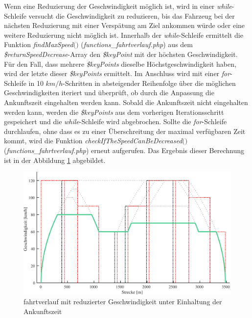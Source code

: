 Wenn eine Reduzierung der Geschwindigkeit möglich ist, wird in einer \textit{while}-Schleife versucht die Geschwindigkeit zu reduzieren, bis das Fahrzeug bei der nächsten Reduzierung mit einer Verspätung am Ziel ankommen würde oder eine weitere Reduzierung nicht möglich ist. Innerhalb der \textit{while}-Schleife ermittelt die Funktion \textit{find\-Max\-Speed$($$)$} (\textit{functions\_fahrtverlauf.php}) aus dem \textit{\$returnSpeedDecrease}-Array den \textit{\$keyPoint} mit der höchsten Geschwindigkeit. Für den Fall, dass mehrere \textit{\$keyPoints} dieselbe Höchstgeschwindigkeit haben, wird der letzte dieser \textit{\$keyPoints} ermittelt. Im Anschluss wird mit einer \textit{for}-Schleife in 10 $km/h$-Schritten in absteigender Reihenfolge über die möglichen Geschwindigkeiten iteriert und überprüft, ob durch die Anpassung die Ankunftszeit eingehalten werden kann. Sobald die Ankunftszeit nicht eingehalten werden kann, werden die \textit{\$keyPoints} aus dem vorherigen Iterationsschritt gespeichert und die \textit{while}-Schleife wird abgebrochen. Sollte die \textit{for}-Schleife durchlaufen, ohne dass es zu einer Überschreitung der maximal verfügbaren Zeit kommt, wird die Funktion \textit{checkIfTheSpeedCanBeDecreased$($$)$} (\textit{functions\_fahrtverlauf.php}) erneut aufgerufen. 
Das Ergebnis dieser Berechnung ist in der Abbildung \ref{fig:it10} abgebildet.
\begin{figure}
\includegraphics[width=\linewidth]{../images/matlab/it10.pdf}
\caption{\Gls{fahrtverlauf} mit reduzierter Geschwindigkeit unter Einhaltung der An\-kunfts\-zeit}
\label{fig:it10}
\end{figure}
